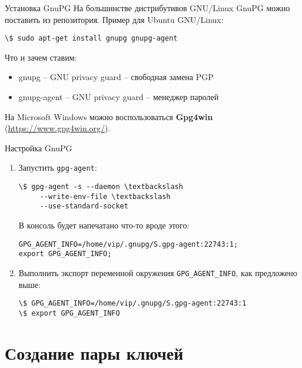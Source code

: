 \documentclass[presentation]{beamer}
\begin{document}
\begin{frame}[fragile]{Установка GnuPG}
  На большинстве дистрибутивов GNU/Linux GnuPG можно поставить из
  репозитория.  Пример для Ubuntu GNU/Linux:
\begin{Verbatim}[commandchars=\\\[\]]
\$ sudo apt-get install gnupg gnupg-agent
\end{Verbatim}
\vspace{5 mm}
Что и зачем ставим:
\begin{itemize}
\item \alert{gnupg} -- GNU privacy guard -- свободная замена PGP
\item \alert{gnupg-agent} -- GNU privacy guard -- менеджер паролей\newline
\end{itemize}

На Microsoft Windows можно воспользоваться \textbf{Gpg4win}
(\url{https://www.gpg4win.org/}).
\end{frame}

\begin{frame}[fragile]{Настройка GnuPG}
  \begin{enumerate}
  \item Запустить \texttt{gpg-agent}:
\begin{Verbatim}[commandchars=\\\[\]]
\$ gpg-agent -s --daemon \textbackslash
     --write-env-file \textbackslash
     --use-standard-socket
\end{Verbatim}
\vspace{5 mm}
В консоль будет напечатано что-то вроде этого:
\begin{Verbatim}[commandchars=\\\[\]]
GPG_AGENT_INFO=/home/vip/.gnupg/S.gpg-agent:22743:1;
export GPG_AGENT_INFO;
\end{Verbatim}
\vspace{5 mm}
\item Выполнить экспорт переменной окружения \texttt{GPG\_AGENT\_INFO},
  как предложено выше:
\begin{Verbatim}[commandchars=\\\[\]]
\$ GPG_AGENT_INFO=/home/vip/.gnupg/S.gpg-agent:22743:1
\$ export GPG_AGENT_INFO
\end{Verbatim}
  \end{enumerate}
\end{frame}


\section{Создание пары ключей}
\end{document}
